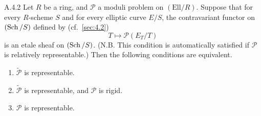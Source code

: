 \begin{pprop}{A.4.2}\label{prop:A.4.2}
Let $R$ be a ring, and $\mathcal{P}$ a moduli problem on $(\mathrm{Ell}/R)$. Suppose that for every $R$-scheme $S$ and for every elliptic curve $E/S$, the contravariant functor on $(\operatorname{Sch}/S)$ defined by (cf.\ \ref{sec:4.2})
\[
T \longmapsto \mathcal{P}(E_T/T)
\]
is an etale sheaf on $(\operatorname{Sch}/S)$. (N.B. This condition is automatically satisfied if $\mathcal{P}$ is relatively representable.) Then the following conditions are equivalent.
\begin{enumerate}[(1)]
\item $\widetilde{\mathcal{P}}$ is representable.
\item $\widetilde{\mathcal{P}}$ is representable, and $\mathcal{P}$ is rigid.
\item $\mathcal{P}$ is representable.
\end{enumerate}
\end{pprop}


